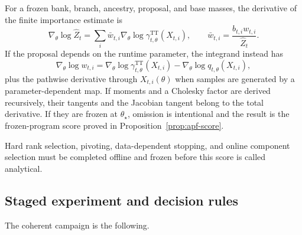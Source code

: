 \documentclass[11pt]{article}
\begin{document}
For a frozen bank, branch, ancestry, proposal, and base masses, the derivative
of the finite importance estimate is
\begin{equation}\label{eq:coherent-frozen-gradient}
 \nabla_\theta\log\widehat Z_t
 =\sum_i\bar w_{t,i}\nabla_\theta\log\gamma_{t,\theta}^{\mathrm{TT}}(X_{t,i}),
 \qquad
 \bar w_{t,i}=\frac{b_{t,i}w_{t,i}}{\widehat Z_t}.
\end{equation}
If the proposal depends on the runtime parameter, the integrand instead has
\begin{equation}\label{eq:coherent-total-weight-gradient}
 \nabla_\theta\log w_{t,i}
 =\nabla_\theta\log\gamma_{t,\theta}^{\mathrm{TT}}(X_{t,i})
  -\nabla_\theta\log q_{t,\theta}(X_{t,i}),
\end{equation}
plus the pathwise derivative through $X_{t,i}(\theta)$ when samples are
generated by a parameter-dependent map. If moments and a Cholesky factor are
derived recursively, their tangents and the Jacobian tangent belong to the
total derivative. If they are frozen at $\theta_\star$, omission is
intentional and the result is the frozen-program score proved in
Proposition~\ref{prop:apf-score}.

Hard rank selection, pivoting, data-dependent stopping, and online component
selection must be completed offline and frozen before this score is called
analytical.

\subsection{Staged experiment and decision rules}

The coherent campaign is the following.
\end{document}
